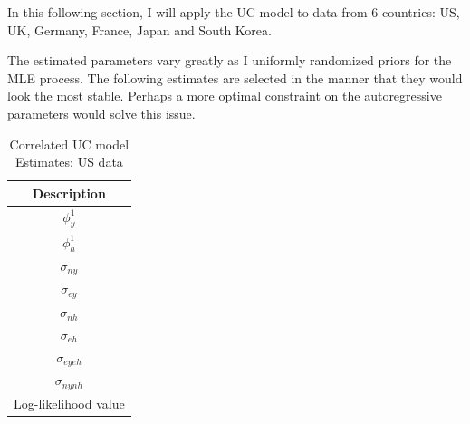 \documentclass[fleqn]{article}
\begin{document}
\begin{outline}[enumerate]
In this following section, I will apply the UC model to data from 6 countries: US, UK, Germany, France, Japan and South Korea.

The estimated parameters vary greatly as I uniformly randomized priors for the MLE process. The following estimates are selected in the manner that they would look the most stable. Perhaps a more optimal constraint on the autoregressive parameters would solve this issue.

\pagebreak


\begin{table}
	\begin{center}
	\caption{Correlated UC model Estimates: US data}
	\begin{tabular}{c}
		\toprule
		Description\\
		\midrule
		$\phi^1_{y}$ \\
		$\phi^1_{h}$ \\
		$\sigma_{ny}$\\
		$\sigma_{ey}$\\
		$\sigma_{nh}$\\
		$\sigma_{eh}$\\
		$\sigma_{eyeh}$\\
		$\sigma_{nynh}$\\
		Log-likelihood value\\
		\bottomrule
	\end{tabular}%
	\end{center}
\end{table}


\end{outline}
\end{document}
